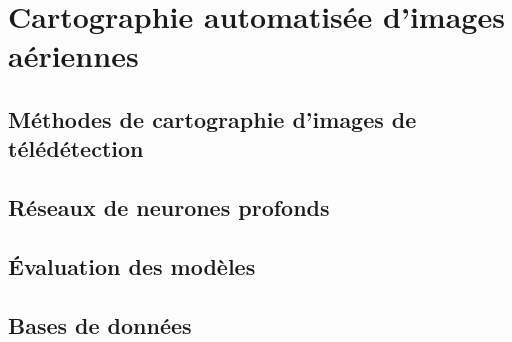 \chapter{Cartographie automatisée d'images aériennes}
	\citationChap{}{}
	\minitoc
	\newpage


\section{Méthodes de cartographie d'images de télédétection}

\section{Réseaux de neurones profonds}

\section{Évaluation des modèles}

\section{Bases de données}
	


